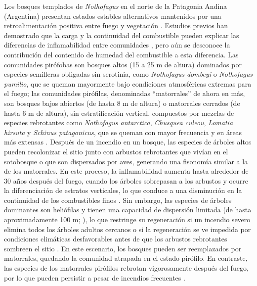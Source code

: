 Los bosques templados de \textit{Nothofagus} en el norte de la Patagonia Andina (Argentina) presentan estados estables alternativos mantenidos por una retroalimentación positiva entre fuego y vegetación \citep{kitzberger_firevegetation_2016}. Estudios previos han demostrado que la carga y la continuidad del combustible pueden explicar las diferencias de inflamabilidad entre comunidades \citep{paritsis_positive_2015, tiribelli_changes_2018}, pero aún se desconoce la contribución del contenido de humedad del combustible a esta diferencia. Las comunidades pirófobas son bosques altos (15 a 25 m de altura) dominados por especies semilleras obligadas sin serotinia, como \textit{Nothofagus dombeyi} o \textit{Nothofagus pumilio}, que se queman mayormente bajo condiciones atmosféricas extremas para el fuego; las comunidades pirófilas, denominadas ``matorrales'' de ahora en más, son bosques bajos abiertos (de hasta 8 m de altura) o matorrales cerrados (de hasta 6 m de altura), sin estratificación vertical, compuestos por mezclas de especies rebrotantes como \textit{Nothofagus antarctica}, \textit{Chusquea culeou}, \textit{Lomatia hirsuta} y \textit{Schinus patagonicus}, que se queman con mayor frecuencia y en áreas más extensas \citep{veblen_fire_2003, mermoz_landscape_2005, paritsis_habitat_2013, morales_stochastic_2015, kitzberger_firevegetation_2016, tiribelli_non-additive_2019}. Después de un incendio en un bosque, las especies de árboles altos pueden recolonizar el sitio junto con arbustos rebrotantes que vivían en el sotobosque o que son dispersados por aves, generando una fisonomía similar a la de los matorrales. En este proceso, la inflamabilidad aumenta hasta alrededor de 30 años después del fuego, cuando los árboles sobrepasan a los arbustos y ocurre la diferenciación de estratos verticales, lo que conduce a una disminución en la continuidad de los combustibles finos \citep{paritsis_positive_2015, tiribelli_changes_2018}. Sin embargo, las especies de árboles dominantes son heliófilas y tienen una capacidad de dispersión limitada (de hasta aproximadamente 100 m; \citealt{landesmann_importance_2018}), lo que restringe su regeneración si un incendio severo elimina todos los árboles adultos cercanos o si la regeneración se ve impedida por condiciones climáticas desfavorables antes de que los arbustos rebrotantes sombreen el sitio \citep{cuevas_tree_2000, kitzberger_effects_2005, tercero-bucardo_field_2007, landesmann_importance_2018}. En este escenario, los bosques pueden ser reemplazados por matorrales, quedando la comunidad atrapada en el estado pirófilo. En contraste, las especies de los matorrales pirófilos rebrotan vigorosamente después del fuego, por lo que pueden persistir a pesar de incendios frecuentes \citep{kitzberger_firevegetation_2016, blackhall_effects_2017, tiribelli_changes_2018, landesmann_increased_2021}.

